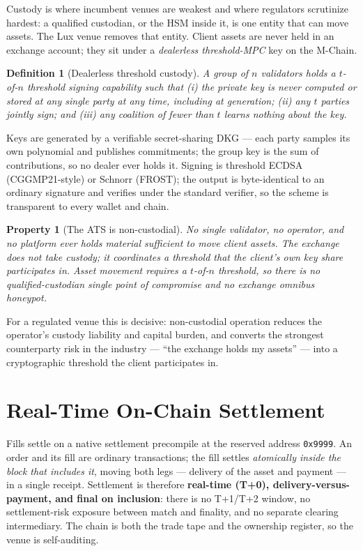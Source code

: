 \documentclass[11pt,a4paper]{article}
\newtheorem{definition}{Definition}[section]
\newtheorem{property}{Property}[section]
\begin{document}
Custody is where incumbent venues are weakest and where regulators scrutinize
hardest: a qualified custodian, or the HSM inside it, is one entity that can
move assets. The Lux venue removes that entity. Client assets are never held
in an exchange account; they sit under a \emph{dealerless threshold-MPC} key
on the M-Chain.

\begin{definition}[Dealerless threshold custody]
A group of $n$ validators holds a $t$-of-$n$ threshold signing capability such
that (i) the private key is never computed or stored at any single party at
any time, including at generation; (ii) any $t$ parties jointly sign; and
(iii) any coalition of fewer than $t$ learns nothing about the key.
\end{definition}

Keys are generated by a verifiable secret-sharing DKG --- each party samples
its own polynomial and publishes commitments; the group key is the sum of
contributions, so no dealer ever holds it. Signing is threshold ECDSA
(CGGMP21-style) or Schnorr (FROST); the output is byte-identical to an
ordinary signature and verifies under the standard verifier, so the scheme is
transparent to every wallet and chain.

\begin{property}[The ATS is non-custodial]
No single validator, no operator, and no platform ever holds material
sufficient to move client assets. The exchange does not take custody; it
coordinates a threshold that the client's own key share participates in.
Asset movement requires a $t$-of-$n$ threshold, so there is no
qualified-custodian single point of compromise and no exchange omnibus honeypot.
\end{property}

For a regulated venue this is decisive: non-custodial operation reduces the
operator's custody liability and capital burden, and converts the strongest
counterparty risk in the industry --- ``the exchange holds my assets'' --- into
a cryptographic threshold the client participates in.

\section{Real-Time On-Chain Settlement}
\label{sec:settle}

Fills settle on a native settlement precompile at the reserved address
\texttt{0x9999}. An order and its fill are ordinary transactions; the fill
settles \emph{atomically inside the block that includes it}, moving both legs
--- delivery of the asset and payment --- in a single receipt. Settlement is
therefore \textbf{real-time (T+0), delivery-versus-payment, and final on
inclusion}: there is no T+1/T+2 window, no settlement-risk exposure between
match and finality, and no separate clearing intermediary. The chain is both
the trade tape and the ownership register, so the venue is self-auditing.
\end{document}
